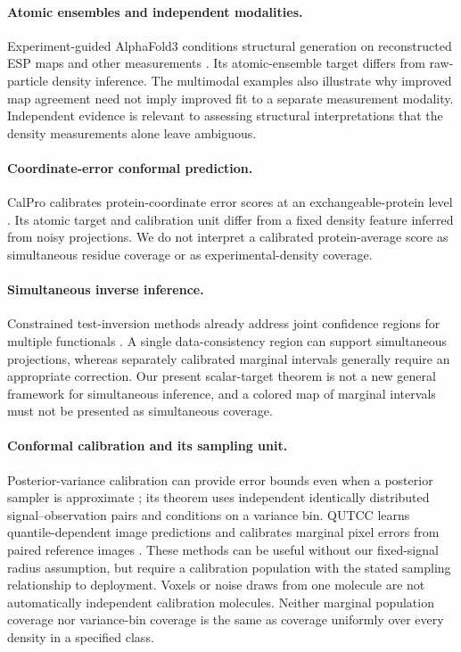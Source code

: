 \paragraph{Atomic ensembles and independent modalities.} Experiment-guided AlphaFold3 conditions structural generation on reconstructed ESP maps and other measurements \citep{guidedaf32026}. Its atomic-ensemble target differs from raw-particle density inference. The multimodal examples also illustrate why improved map agreement need not imply improved fit to a separate measurement modality. Independent evidence is relevant to assessing structural interpretations that the density measurements alone leave ambiguous.

\paragraph{Coordinate-error conformal prediction.} CalPro calibrates protein-coordinate error scores at an exchangeable-protein level \citep{calpro2026}. Its atomic target and calibration unit differ from a fixed density feature inferred from noisy projections. We do not interpret a calibrated protein-average score as simultaneous residue coverage or as experimental-density coverage.

\paragraph{Simultaneous inverse inference.} Constrained test-inversion methods already address joint confidence regions for multiple functionals \citep{batlle2025}. A single data-consistency region can support simultaneous projections, whereas separately calibrated marginal intervals generally require an appropriate correction. Our present scalar-target theorem is not a new general framework for simultaneous inference, and a colored map of marginal intervals must not be presented as simultaneous coverage.

\paragraph{Conformal calibration and its sampling unit.} Posterior-variance calibration can provide error bounds even when a posterior sampler is approximate \citep{narnhofer2024}; its theorem uses independent identically distributed signal--observation pairs and conditions on a variance bin. QUTCC learns quantile-dependent image predictions and calibrates marginal pixel errors from paired reference images \citep{qutcc2026}. These methods can be useful without our fixed-signal radius assumption, but require a calibration population with the stated sampling relationship to deployment. Voxels or noise draws from one molecule are not automatically independent calibration molecules. Neither marginal population coverage nor variance-bin coverage is the same as coverage uniformly over every density in a specified class.

